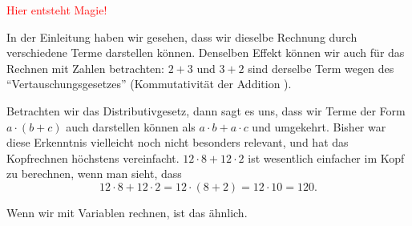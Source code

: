 \documentclass[../../main.tex]{subfiles}
\begin{document}
	\textcolor{red}{Hier entsteht Magie!}

	In der Einleitung haben wir gesehen, dass wir dieselbe Rechnung durch verschiedene Terme darstellen können.
	Denselben Effekt können wir auch für das Rechnen mit Zahlen betrachten: $2+3$ und $3+2$ sind derselbe Term
	wegen des \enquote{Vertauschungsgesetzes} (Kommutativität der Addition \mayberef).

	Betrachten wir das Distributivgesetz, dann sagt es uns, dass wir Terme der Form $a\cdot (b+c)$ auch
	darstellen können als $a\cdot b + a\cdot c$ und umgekehrt. Bisher war diese Erkenntnis vielleicht noch nicht
	besonders relevant, und hat das Kopfrechnen höchstens vereinfacht. $12\cdot 8 + 12\cdot 2$ ist wesentlich
	einfacher im Kopf zu berechnen, wenn man sieht, dass
	\[12\cdot 8 + 12\cdot 2 = 12\cdot(8+2) = 12\cdot 10 = 120.\]

	Wenn wir mit Variablen rechnen, ist das ähnlich.

	
\end{document}
